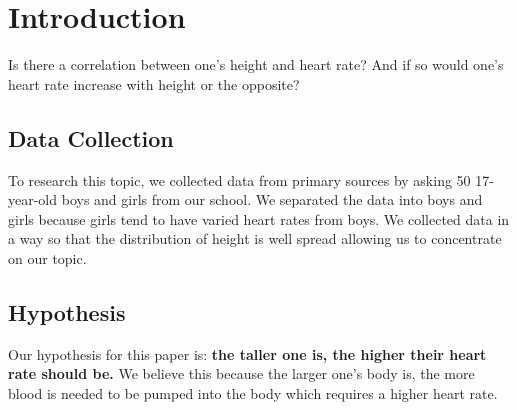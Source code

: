 \chapter{Introduction}

Is there a correlation between one's height and heart rate? And if so would one's heart rate increase with height or the opposite? 

\section{Data Collection}

To research this topic, we collected data from primary sources by asking 50 17-year-old boys and girls from our school. We separated the data into boys and girls because girls tend to have varied heart rates from boys. We collected data in a way so that the distribution of height is well spread allowing us to concentrate on our topic. 

\section{Hypothesis}

Our hypothesis for this paper is: \textbf{the taller one is, the higher their heart rate should be.} We believe this because the larger one's body is, the more blood is needed to be pumped into the body which requires a higher heart rate.

